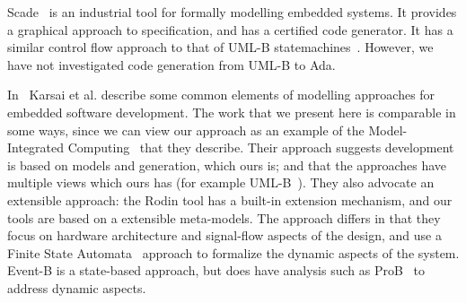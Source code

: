 Scade~\cite{Berry07} is an industrial tool for formally modelling embedded systems. It provides a graphical approach to specification, and has a certified code generator. It has a similar control flow approach to that of UML-B statemachines~\cite{SnookB08}. However, we have not investigated code generation from UML-B to Ada. 

In~\cite{KarsaiSLB03} Karsai et al. describe some common elements of modelling approaches for embedded software development. The work that we present here is comparable in some ways, since we can view our approach as an example of the Model-Integrated Computing~\cite{NeemaK04} that they describe. Their approach suggests development is based on models and generation, which ours is; and that the approaches have multiple views which ours has (for example UML-B~\cite{SnookB08}). They also advocate an extensible approach: the Rodin tool has a built-in extension mechanism, and our tools are based on a extensible meta-models. The approach differs in that they focus on hardware architecture and signal-flow aspects of the design, and use a Finite State Automata~\cite{Henzinger96} approach to formalize the dynamic aspects of the system. Event-B is a state-based approach, but does have analysis such as ProB~\cite{ProB} to address dynamic aspects.

